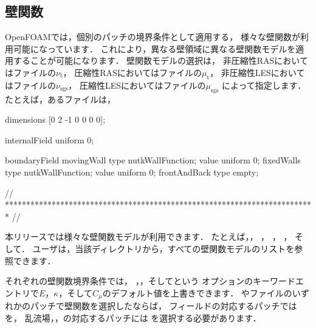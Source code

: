 \subsection{壁関数}
\label{ssec:7.2.2}
OpenFOAMでは，個別のパッチの境界条件として適用する，
様々な壁関数が利用可能になっています．
これにより，異なる壁領域に異なる壁関数モデルを適用することが可能になります．
壁関数モデルの選択は，
非圧縮性RASにおいてはファイルの$\nu_{\mathrm{t}}$，
圧縮性RASにおいてはファイルの$\mu_{\mathrm{t}}$，
非圧縮性LESにおいてはファイルの$\nu_{\mathrm{sgs}}$，
圧縮性LESにおいてはファイルの$\mu_{\mathrm{sgs}}$
によって指定します．
たとえば，あるファイルは，
\begin{OFverbatim}[file, linenum=17]

dimensions      [0 2 -1 0 0 0 0];

internalField   uniform 0;

boundaryField
{
    movingWall
    {
        type            nutkWallFunction;
        value           uniform 0;
    }
    fixedWalls
    {
        type            nutkWallFunction;
        value           uniform 0;
    }
    frontAndBack
    {
        type            empty;
    }
}


// ************************************************************************* //
\end{OFverbatim}
本リリースでは様々な壁関数モデルが利用できます．
たとえば，，\break
{}，
，\break
{}，
そして．
ユーザは，当該ディレクトリから，すべての壁関数モデルのリストを参照できます．

それぞれの壁関数境界条件では，
，，そしてという
オプションのキーワードエントリで$E$，$\kappa$，そして$C_{\mu}$のデフォルト値を上書きできます．
やファイルのいずれかのパッチで壁関数を選択したならば，
フィールドの対応するパッチではを，
乱流場，，の対応するパッチには
を選択する必要があります．

